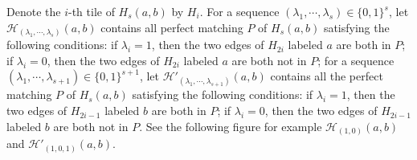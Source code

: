 \documentclass[10pt]{amsart}
\theoremstyle{theorems}
\begin{document}
Denote the $i$-th tile of $H_s(a,b)$ by $H_i$. For a sequence $(\lambda_1,\cdots,\lambda_s)\in \{0,1\}^{s}$, let $\mathcal H_{(\lambda_1,\cdots,\lambda_s)}(a,b)$ contains all perfect matching $P$ of $H_s(a,b)$ satisfying the following conditions: if $\lambda_i=1$, then the two edges of $H_{2i}$ labeled $a$ are both in $P$; if $\lambda_i=0$, then the two edges of $H_{2i}$ labeled $a$ are both not in $P$; for a sequence $(\lambda_1,\cdots,\lambda_{s+1})\in \{0,1\}^{s+1}$, let $\mathcal H'_{(\lambda_1,\cdots,\lambda_{s+1})}(a,b)$ contains all the perfect matching $P$ of $H_s(a,b)$ satisfying the following conditions: if $\lambda_i=1$, then the two edges of $H_{2i-1}$ labeled $b$ are both in $P$; if $\lambda_i=0$, then the two edges of $H_{2i-1}$ labeled $b$ are both not in $P$. See the following figure for example $\mathcal H_{(1,0)}(a,b)$ and $\mathcal H'_{(1,0,1)}(a,b)$.
\end{document}
